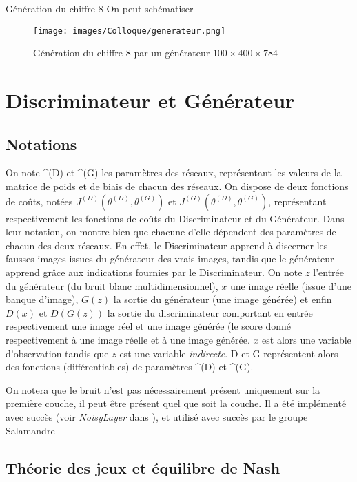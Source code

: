\begin{example} Génération du chiffre 8
On peut schématiser 
\begin{figure}[h]
\begin{center}
\texttt{[image: images/Colloque/generateur.png]}\caption{Génération du chiffre 8 par un générateur $100\times 400\times 784$}
\end{center}
\end{figure} 
\end{example}
\section{Discriminateur et Générateur}
\subsection{Notations}
On note \theta^{(D)} et \theta^{(G)} les paramètres des réseaux, représentant les valeurs de la matrice de poids et de biais de chacun des réseaux.
On dispose de deux fonctions de coûts, notées $J^{(D)}(\theta^{(D)}, \theta^{(G)})$ et $J^{(G)}(\theta^{(D)}, \theta^{(G)})$, représentant respectivement les fonctions de coûts du Discriminateur et du Générateur. Dans leur notation, on montre bien que chacune d'elle dépendent des paramètres de chacun des deux réseaux. En effet, le Discriminateur apprend à discerner les fausses images issues du générateur des vrais images, tandis que le générateur apprend grâce aux indications fournies par le Discriminateur. 
On note $z$ l'entrée du générateur (du bruit blanc multidimensionnel), $x$ une image réelle (issue d'une banque d'image), $G(z)$ la sortie du générateur (une image générée) et enfin $D(x)$ et $D(G(z))$ la sortie du discriminateur comportant en entrée respectivement une image réel et une image générée (le score donné respectivement à une image réelle et à une image générée. 
$x$ est alors une variable d'observation tandis que $z$ est une variable \textit{indirecte}. 
D et G représentent alors des fonctions (différentiables) de paramètres \theta^{(D)} et \theta^{(G)}.
\begin{remarque}
On notera que le bruit n'est pas nécessairement présent uniquement sur la première couche, il peut être présent quel que soit la couche. Il a été implémenté avec succès (voir \textit{NoisyLayer} dans \cite{barrios_gan_2018}), et utilisé avec succès par le groupe Salamandre \cite{bouvier_dyvoire_dessine-moi_2018}
\end{remarque}
\subsection{Théorie des jeux et équilibre de Nash}
